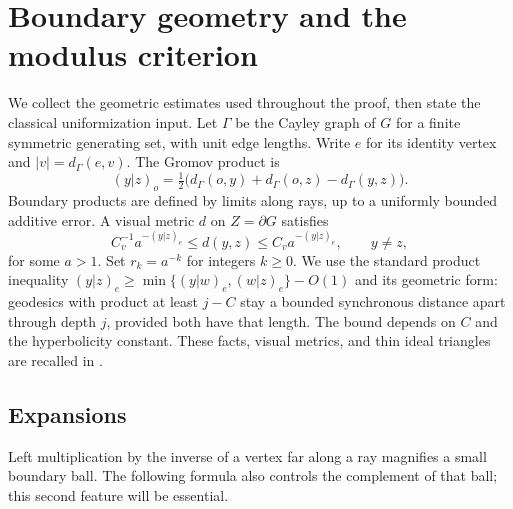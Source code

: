 \section{Boundary geometry and the modulus criterion}
\label{sec:geometry}

We collect the geometric estimates used throughout the proof, then state
the classical uniformization input. Let $\Gamma$ be the Cayley graph of
$G$ for a finite symmetric generating set, with unit edge lengths. Write
$e$ for its identity vertex and $|v|=d_\Gamma(e,v)$.
The Gromov product is
\[
 (y|z)_o=\tfrac12\bigl(d_\Gamma(o,y)+d_\Gamma(o,z)-d_\Gamma(y,z)\bigr).
\]
Boundary products are defined by limits along rays, up to a uniformly
bounded additive error. A visual metric $d$ on $Z=\partial G$ satisfies
\begin{equation}
 C_v^{-1}a^{-(y|z)_e}\le d(y,z)\le C_va^{-(y|z)_e},
 \qquad y\ne z,
 \label{eq:visual}
\end{equation}
for some $a>1$. Set $r_k=a^{-k}$ for integers $k\ge0$.
We use the standard product inequality
$(y|z)_e\ge\min\{(y|w)_e,(w|z)_e\}-O(1)$ and its geometric form:
geodesics with product at least $j-C$ stay a bounded synchronous
distance apart through depth $j$, provided both have that length.
The bound depends on $C$ and the
hyperbolicity constant. These facts, visual metrics, and thin ideal
triangles are recalled in \cite[III.H.3]{BH}.

\subsection{Expansions}

Left multiplication by the inverse of a vertex far along a ray magnifies
a small boundary ball. The following formula also controls the complement
of that ball; this second feature will be essential.

